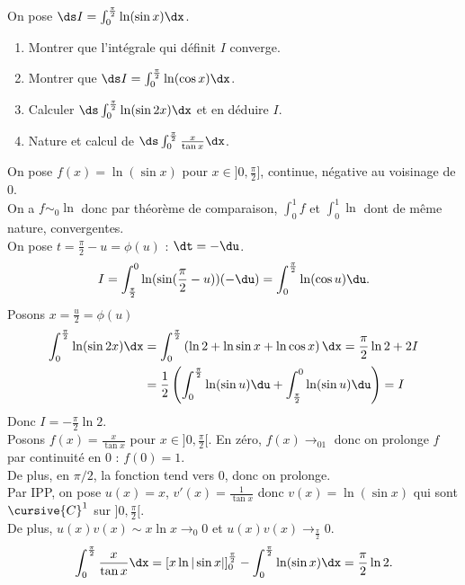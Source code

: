\documentclass[11pt]{article}
\begin{document}
\begin{exercice}{}{}
    On pose $\ds I=\int_0^{\frac{\pi}{2}}\ln(\sin x)\dx$.
    \begin{enumerate}
        \item Montrer que l'intégrale qui définit $I$ converge.
        \item Montrer que $\ds I=\int_0^{\frac{\pi}{2}}\ln(\cos x)\dx$.
        \item Calculer $\ds\int_0^\frac{\pi}{2}\ln(\sin 2x)\dx$ et en déduire $I$.
        \item Nature et calcul de $\ds\int_0^\frac{\pi}{2}\frac{x}{\tan x}\dx$.
    \end{enumerate}
    \tcblower
     On pose $f(x)=\ln(\sin x)$ pour $x\in]0,\frac{\pi}{2}]$, continue, négative au voisinage de 0.\\
    On a $f\sim_0\ln$ donc par théorème de comparaison, $\int_0^1 f$ et $\int_0^1\ln$ dont de même nature, convergentes.\\
     On pose $t=\frac{\pi}{2}-u=\phi(u)$ : $\dt=-\du$.
    \begin{equation*}
        I=\int_{\frac{\pi}{2}}^0\ln(\sin(\frac{\pi}{2}-u))(-\du)=\int_0^{\frac{\pi}{2}}\ln(\cos u)\du.
    \end{equation*}
     Posons $x=\frac{u}{2}=\phi(u)$
    \begin{align*}
        \int_0^{\frac{\pi}{2}}\ln(\sin 2x)\dx &= \int_0^\frac{\pi}{2}\left( \ln 2 + \ln \sin x + \ln \cos x \right)\dx = \frac{\pi}{2}\ln2+2I\\
        &=\frac{1}{2}\left(\int_0^\frac{\pi}{2}\ln(\sin u)\du + \int_{\frac{\pi}{2}}^0\ln(\sin u)\du\right) = I
    \end{align*}
    Donc $I=-\frac{\pi}{2}\ln2$.\\
     Posons $f(x)=\frac{x}{\tan x}$ pour $x\in]0,\frac{\pi}{2}[$. En zéro, $f(x)\to_01$ donc on prolonge $f$ par continuité en $0$ : $f(0)=1$.\\
    De plus, en $\pi/2$, la fonction tend vers 0, donc on prolonge.\\
    Par IPP, on pose $u(x)=x$, $v'(x)=\frac{1}{\tan x}$ donc $v(x)=\ln(\sin x)$ qui sont $\cursive{C}^1$ sur $]0,\frac{\pi}{2}[$.\\
    De plus, $u(x)v(x)\sim x\ln x \to_0 0$ et $u(x)v(x)\to_{\frac{\pi}{2}}0$.
    \begin{equation*}
        \int_0^{\frac{\pi}{2}}\frac{x}{\tan x}\dx = \left[ x\ln|\sin x| \right]_0^{\frac{\pi}{2}} - \int_0^{\frac{\pi}{2}}\ln(\sin x)\dx = \frac{\pi}{2}\ln 2.
    \end{equation*}
\end{exercice}
\end{document}
